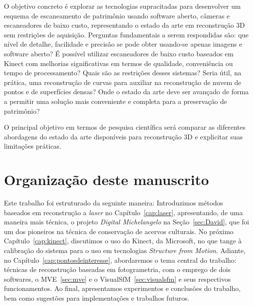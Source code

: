 O objetivo concreto é explorar as tecnologias supracitadas para
desenvolver um esquema de escaneamento de patrimônio usando software aberto, câmeras e
escaneadores de baixo custo, representando o estado da arte em reconstrução 3D sem
restrições de aquisição. Perguntas fundamentais a serem respondidas são: que
nível de detalhe, facilidade e precisão se pode obter usando-se apenas imagens e software
aberto? É possível utilizar escaneadores de baixo custo baseados em Kinect com
melhorias significativas em termos de qualidade, conveniência ou tempo de
processamento?  Quais são as restrições desses sistemas? Seria útil, na prática,
uma reconstrução de curvas para auxiliar na reconstrução de nuvem de pontos e de
superfícies densas? Onde o estado da arte deve ser avançado de forma a permitir
uma solução mais conveniente e completa para a preservação de patrimônio?

O principal objetivo em termos de pesquisa científica será comparar as
diferentes abordagens do estado da arte disponíveis para reconstrução 3D e
explicitar suas limitações práticas.

\section*{Organização deste manuscrito}

Este trabalho foi estruturado da seguinte maneira: Introduzimos
métodos baseados em reconstrução a \emph{laser} no Capítulo~\ref{cap:laser},
apresentando, de uma maneira mais técnica, o projeto \emph{Digital
Michelangelo} na Seção~\ref{sec:David}, que foi um dos pioneiros na técnica de
conservação de acervos culturais. No próximo Capítulo~\ref{cap:kinect},
discutimos o uso do Kinect, da Microsoft, no que tange à calibração do sistema
para o uso em tecnologias \emph{Structure from Motion}.  Adiante, no
Capítulo~\ref{cap:pontosdeinteresse}, abordaremos o tema central do trabalho:
técnicas de reconstrução baseadas em fotogrametria, com o emprego de dois
softwares, o MVE~\ref{sec:mve} e o VisualSfM~\ref{sec:visualsfm} e seus
respectivos funcionamentos. Ao final, apresentamos experimentos e conclusões
do trabalho, bem como sugestões para implementações e trabalhos futuros.

